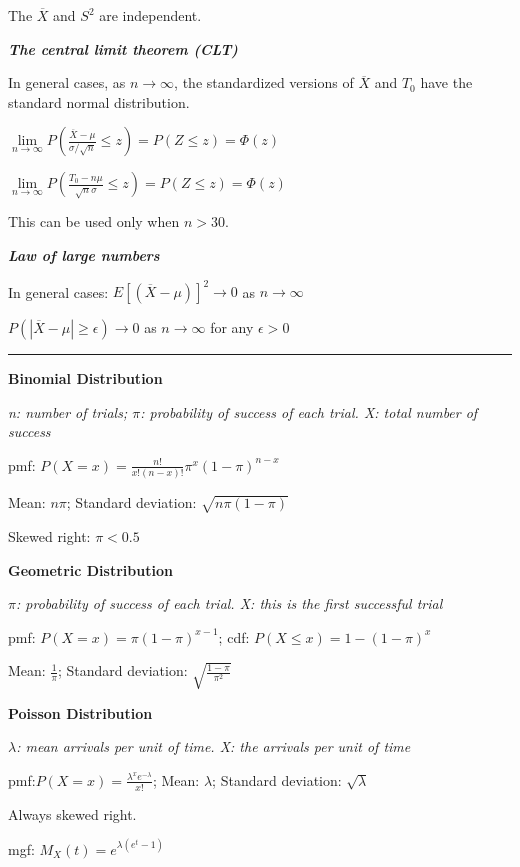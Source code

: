 \documentclass{article}
\newcommand{\sectionline}{\color{black}\rule[2pt]{0.45\textwidth}{0.05em}\color{black}}
\newcommand{\bigtitle}[1]{
	\noindent
	\textbf{#1}
}
\newcommand{\smalltitle}[1]{
	\noindent
	\textbf{\textit{#1}}
}
\begin{document}
	The $ \overline{X}$ and $S^2 $ are independent.
	
	\smalltitle{The central limit theorem (CLT)}
	
	In general cases, as $n \to \infty$, the standardized versions of $\overline{X}$ and $T_0$ have the standard normal distribution.
	
	$\lim \limits_{n \to \infty}P(\frac{\overline{X}-\mu}{\sigma/\sqrt{n}}\leq z) = P(Z\leq z) = \Phi(z)$
	
	$\lim \limits_{n \to \infty}P(\frac{T_0-n\mu}{\sqrt{n}\sigma}\leq z) = P(Z\leq z) = \Phi(z)$
	
	This can be used only when $n > 30$.
	
	\smalltitle{Law of large numbers}
	
	In general cases:
	$E[(\overline{X}-\mu)]^2\to 0$ as $n\to \infty$
	
	$P(\left|\overline{X}-\mu\right| \geq \epsilon) \to 0$ as $n \to \infty$ for any $\epsilon > 0$
	
	
	
	\sectionline
	
	\bigtitle{Binomial Distribution}
	
	\textit{n: number of trials; $\pi$: probability of success of each trial. X: total number of success}
	
	pmf: $P(X=x) = \frac{n!}{x!(n-x)!}\pi^x(1-\pi)^{n-x}$
	
	Mean: $n\pi$; 
	Standard deviation: $\sqrt{n\pi (1-\pi)}$
	
	Skewed right: $\pi < 0.5$
	
	\bigtitle{Geometric Distribution}
	
	
	\textit{$\pi$: probability of success of each trial. X: this is the first successful trial}
	
	\noindent
	pmf: $P(X=x) = \pi(1-\pi)^{x-1}$; 
	cdf: $P(X\leq x) = 1-(1-\pi)^{x}$
	
	Mean: $\frac{1}{\pi}$; 
	Standard deviation: $\sqrt{\frac{1-\pi}{\pi^2}}$
	
	\bigtitle{Poisson Distribution}
	
	\textit{$\lambda$: mean arrivals per unit of time. X: the arrivals per unit of time}
	
	pmf:$P(X=x) = \frac{\lambda^xe^{-\lambda}}{x!}$;
	Mean: $\lambda$; 
	Standard deviation: $\sqrt{\lambda}$
	
	Always skewed right.
	
	mgf: $M_X(t) = e^{\lambda(e^t-1)}$
	
	
	
\end{document}
